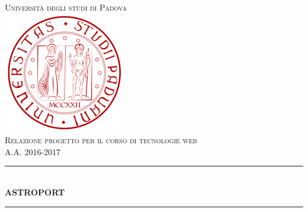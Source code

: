 \begin{titlepage}

\newcommand{\HRule}{\rule{\linewidth}{0.5mm}} %

\center %
 

\textsc{\LARGE Università degli studi di Padova}\\[1.5cm] %
\includegraphics[scale=0.3]{images/unipd_logo.png}\\[1cm] %
\textsc{\Large Relazione progetto per il corso di tecnologie web}\\[0.5cm] %
\textsc{\large A.A. 2016-2017}\\[0.5cm] %


\HRule \\[0.4cm]
{ \huge \bfseries ASTROPORT}\\[0.4cm] %
\HRule \\[1.5cm]
 


\end{titlepage}
